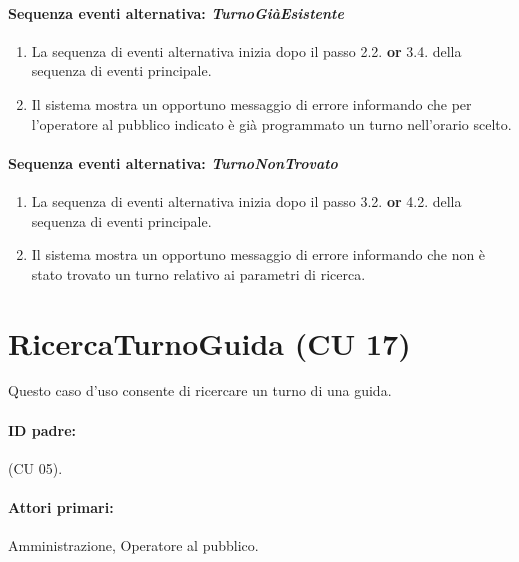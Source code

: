 \documentclass{article}
\begin{document}
	\paragraph{Sequenza eventi alternativa: \textit{TurnoGiàEsistente}}
	\begin{enumerate}	[leftmargin=28pt]
			\item  La sequenza di eventi alternativa inizia dopo il passo 2.2. \textbf{or} 3.4. della sequenza di eventi principale.
			\item  Il sistema mostra un opportuno messaggio di errore informando che per l'operatore al pubblico indicato è già programmato un turno nell'orario scelto.
		\end{enumerate}
		
	\paragraph{Sequenza eventi alternativa: \textit{TurnoNonTrovato}}
	\begin{enumerate}	[leftmargin=28pt]
			\item  La sequenza di eventi alternativa inizia dopo il passo 3.2. \textbf{or} 4.2. della sequenza di eventi principale.
			\item  Il sistema mostra un opportuno messaggio di errore informando che non è stato trovato un turno relativo ai parametri di ricerca.
		\end{enumerate}
	
	
	
	
	
	
	
	

	
	
\pagebreak 

		\section*{RicercaTurnoGuida (CU 17)}
	
	\indent\indent Questo caso d'uso consente di ricercare un turno di una guida. 

	\paragraph{ID padre:}(CU 05).
	
	\paragraph{Attori primari:}Amministrazione, Operatore al pubblico.
	
\end{document}
